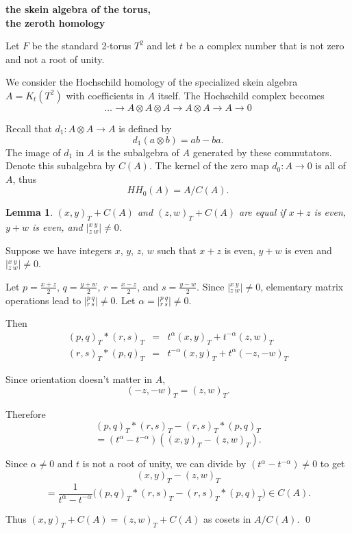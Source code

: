 \documentclass{slides}
\newcommand{\ot}{\otimes}
\newtheorem{lemma}{Lemma}
\theoremstyle{definition}
\begin{document}
\begin{slide}
\textbf{the skein algebra of the torus,\\ the zeroth homology}

Let $F$ be the
standard 2-torus $T^2$ and let
$t$ be a complex number that is not zero and not a root of unity.

We consider the Hochschild homology
of the specialized skein algebra $A = K_t(T^2)$ with
coefficients in $A$ itself.
The Hochschild complex becomes
\[
\dots \to A \ot A \ot A \to A \ot A \to A \to 0
\]

Recall that $d_1: A \ot A \to A$ is defined by
$$d_1(a \ot b) = ab - ba.$$  The image of $d_1$
in $A$ is the subalgebra of $A$ generated by these
commutators.  Denote this subalgebra by $C(A)$.
The kernel of the zero map $d_0 : A \to 0$ is
all of $A$, thus $$HH_0(A) = A/C(A).$$
\end{slide}


\begin{slide}
\begin{lemma}
$(x,y)_T + C(A)$ and $(z,w)_T + C(A)$ are equal
if $x + z$ is even, $y + w$ is
even, and ${|^{x~y}_{z~w}|} \neq 0$.
\label{lemma1}
\end{lemma}

\proof
Suppose we have integers $x$, $y$,
$z$, $w$ such that $x+z$ is even, $y + w$ is even and
${|^{x~y}_{z~w}|} \neq 0$.

Let $p = \frac{x+z}{2}$,
$q = \frac{y+w}{2}$, $r = \frac{x-z}{2}$, and $s = \frac{y-w}{2}$.
Since 
${|^{x~y}_{z~w}|} \neq 0$,
elementary matrix operations lead to
${|^{p~q}_{r~s}|} \neq 0$.
Let $\alpha =
{|^{p~q}_{r~s}|} \neq 0$.

Then 
\begin{eqnarray}
(p,q)_T * (r,s)_T & = & t^{\alpha} (x,y)_T + t^{-\alpha} (z,w)_T \nonumber \\
(r,s)_T * (p,q)_T & = & t^{-\alpha} (x,y)_T + t^{\alpha} (-z,-w)_T \nonumber
\end{eqnarray}
\end{slide}

\begin{slide}
Since orientation doesn't matter in $A$,
$$(-z,-w)_T = (z,w)_T.$$

Therefore
$$(p,q)_T * (r,s)_T - (r,s)_T * (p,q)_T$$
$$ = (t^{\alpha} - t^{-\alpha})((x,y)_T - (z,w)_T).$$

Since $\alpha \neq 0$ and $t$ is not a root of unity, we can divide by
$(t^{\alpha} - t^{-\alpha}) \neq 0$ to get
$$(x,y)_T - (z,w)_T$$
$$= \frac{1}{t^{\alpha} - t^{-\alpha}}
\Big( (p,q)_T * (r,s)_T - (r,s)_T * (p,q)_T \Big) \in C(A).$$

Thus $(x,y)_T + C(A) = (z,w)_T + C(A)$ as cosets in $A/C(A)$.
\qed
\end{slide}
\end{document}
